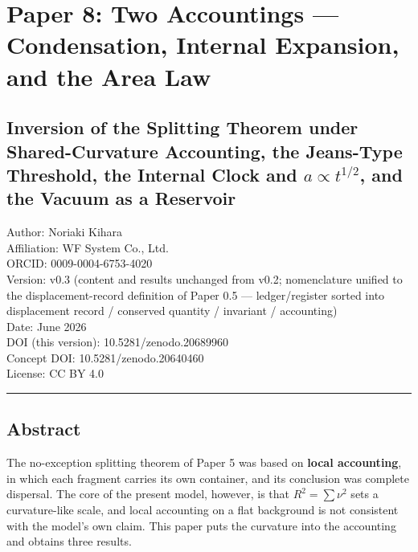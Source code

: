 \documentclass[
]{ltjsarticle}
\author{}
\date{}
\begin{document}
\section{Paper 8: Two Accountings --- Condensation, Internal Expansion,
and the Area
Law}\label{paper-8-two-accountings-condensation-internal-expansion-and-the-area-law}

\subsection{\texorpdfstring{Inversion of the Splitting Theorem under
Shared-Curvature Accounting, the Jeans-Type Threshold, the Internal
Clock and \(a\propto t^{1/2}\), and the Vacuum as a
Reservoir}{Inversion of the Splitting Theorem under Shared-Curvature Accounting, the Jeans-Type Threshold, the Internal Clock and a\textbackslash propto t\^{}\{1/2\}, and the Vacuum as a Reservoir}}\label{inversion-of-the-splitting-theorem-under-shared-curvature-accounting-the-jeans-type-threshold-the-internal-clock-and-apropto-t12-and-the-vacuum-as-a-reservoir}

Author: Noriaki Kihara\\
Affiliation: WF System Co., Ltd.\\
ORCID: 0009-0004-6753-4020\\
Version: v0.3 (content and results unchanged from v0.2; nomenclature
unified to the displacement-record definition of Paper 0.5 ---
ledger/register sorted into displacement record / conserved quantity /
invariant / accounting)\\
Date: June 2026\\
DOI (this version): 10.5281/zenodo.20689960\\
Concept DOI: 10.5281/zenodo.20640460\\
License: CC BY 4.0

\begin{center}\rule{0.5\linewidth}{0.5pt}\end{center}

\subsection{Abstract}\label{abstract}

The no-exception splitting theorem of Paper 5 was based on \textbf{local
accounting}, in which each fragment carries its own container, and its
conclusion was complete dispersal. The core of the present model,
however, is that \(R^2=\sum\nu^2\) sets a curvature-like scale, and
local accounting on a flat background is not consistent with the model's
own claim. This paper puts the curvature into the accounting and obtains
three results.
\end{document}
